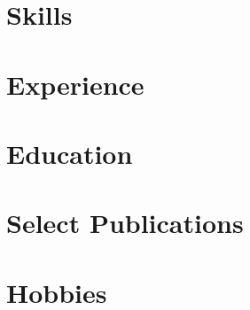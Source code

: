 \documentclass[letter,10pt]{article}
\begin{document}


\section{Skills}


\section{Experience}


\section{Education}



%
\section{Select Publications}


\section{Hobbies}

\end{document}
